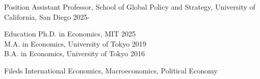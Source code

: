 \documentclass{resume} %
\begin{document}
\begin{rSection}{Position}
Assistant Professor, School of Global Policy and Strategy, University of California, San Diego \hfill 2025-
\end{rSection}
\begin{rSection}{Education}
Ph.D. in Economics, MIT \hfill 2025\\
M.A. in Economics, University of Tokyo \hfill 2019\\
B.A. in Economics, University of Tokyo \hfill 2016
\end{rSection}

\begin{rSection}{Fileds}
    International Economics, Macroeconomics, Political Economy
\end{rSection}
\end{document}
